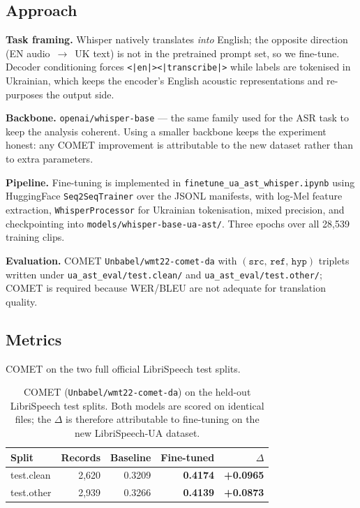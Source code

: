 \documentclass[11pt]{article}
\begin{document}
\subsection{Approach}
\textbf{Task framing.} Whisper natively translates \emph{into} English; the
opposite direction (EN audio~$\rightarrow$~UK text) is not in the pretrained
prompt set, so we fine-tune. Decoder conditioning forces
\texttt{<|en|><|transcribe|>} while labels are tokenised in Ukrainian, which
keeps the encoder's English acoustic representations and re-purposes the
output side.

\noindent\textbf{Backbone.} \texttt{openai/whisper-base} --- the same family
used for the ASR task to keep the analysis coherent. Using a smaller backbone
keeps the experiment honest: any COMET improvement is attributable to the new
dataset rather than to extra parameters.

\noindent\textbf{Pipeline.} Fine-tuning is implemented in
\texttt{finetune\_ua\_ast\_whisper.ipynb} using HuggingFace
\texttt{Seq2SeqTrainer} over the JSONL manifests, with log-Mel feature
extraction, \texttt{WhisperProcessor} for Ukrainian tokenisation, mixed
precision, and checkpointing into \texttt{models/whisper-base-ua-ast/}.
Three epochs over all 28{,}539 training clips.

\noindent\textbf{Evaluation.} COMET \texttt{Unbabel/wmt22-comet-da} with
$(\texttt{src},\,\texttt{ref},\,\texttt{hyp})$ triplets written under
\texttt{ua\_ast\_eval/test.clean/} and \texttt{ua\_ast\_eval/test.other/};
COMET is required because WER/BLEU are not adequate for translation quality.

\subsection{Metrics}
COMET on the two full official LibriSpeech test splits.

\begin{table}[h]
\centering
\begin{tabular}{lrrrr}
\toprule
\textbf{Split} & \textbf{Records} & \textbf{Baseline} & \textbf{Fine-tuned} & \textbf{$\Delta$} \\
\midrule
test.clean & 2{,}620 & 0.3209 & \textbf{0.4174} & \textbf{+0.0965} \\
test.other & 2{,}939 & 0.3266 & \textbf{0.4139} & \textbf{+0.0873} \\
\bottomrule
\end{tabular}
\caption{COMET (\texttt{Unbabel/wmt22-comet-da}) on the held-out
LibriSpeech test splits. Both models are scored on identical files; the
$\Delta$ is therefore attributable to fine-tuning on the new LibriSpeech-UA
dataset.}
\end{table}
\end{document}
